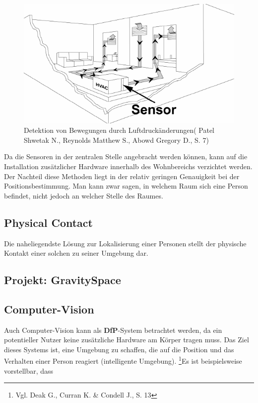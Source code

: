 \begin{figure}[H]
	\centering
	\includegraphics[width=1.0\textwidth]{pictures/dap_klima}
	\caption{Detektion von Bewegungen durch Luftdruckänderungen( Patel Shwetak N., Reynolds Matthew S., Abowd Gregory D., S. 7)}
\end{figure} 

Da die Sensoren in der zentralen Stelle angebracht werden können, kann auf die Installation zusätzlicher Hardware innerhalb des Wohnbereichs verzichtet werden. Der Nachteil diese Methoden liegt in der relativ geringen Genauigkeit bei der Positionsbestimmung. Man kann zwar sagen, in welchem Raum sich eine Person befindet, nicht jedoch an welcher Stelle des Raumes.

\subsection{Physical Contact}
Die naheliegendste Lösung zur Lokalisierung einer Personen stellt der physische Kontakt einer solchen zu seiner Umgebung dar. 
\subsection{Projekt: GravitySpace}
\subsection{Computer-Vision}
Auch Computer-Vision kann als \textbf{DfP}-System betrachtet werden, da ein potentieller Nutzer keine zusätzliche Hardware am Körper tragen muss. Das Ziel dieses Systems ist, eine Umgebung zu schaffen, die auf die Position und das Verhalten einer Person reagiert (intelligente Umgebung). \footnote{Vgl. Deak G., Curran K. \& Condell J., S. 13}\newline Es ist beispielsweise vorstellbar, dass 

